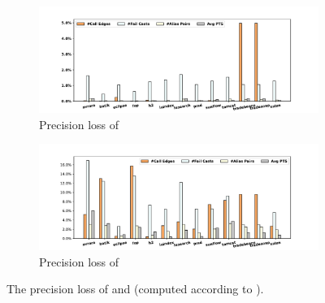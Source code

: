 \begin{figure}[t]
\centering
\begin{subfigure}[b]{\textwidth}
     \centering
     \includegraphics[width=\textwidth]{precisionlossSelectx.pdf}
     \caption{Precision loss of }
     \label{fig:selectxprecisionloss}
 \end{subfigure}
 \hfill
 \begin{subfigure}[b]{\textwidth}
     \centering
     \includegraphics[width=\textwidth]{precisionlossZipper.pdf}
     \caption{Precision loss of }
     \label{fig:zipperprecisionloss}
\end{subfigure}
\caption{The precision loss of  and  (computed according to ). 
\label{fig:precisionlosses}}
\end{figure}

